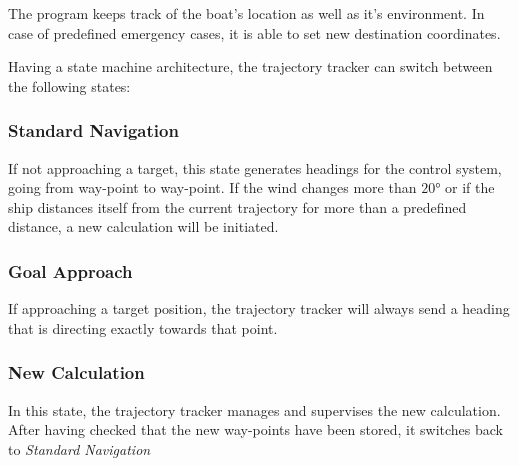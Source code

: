 The program keeps track of the boat's location as well as it's environment. In
case of predefined emergency cases, it is able to set new destination coordinates.

Having a state machine architecture, the trajectory tracker can switch between
the following states:
%
\subsubsection{Standard Navigation}
If not approaching a target, this state generates headings for the
control system, going from way-point to way-point. If the wind changes more than $20$°
or if the ship distances itself from the current trajectory for more than a
predefined distance, a new calculation will be initiated. 
\subsubsection{Goal Approach}
If approaching a target position, the trajectory tracker will always send a
heading that is directing exactly towards that point.
\subsubsection{New Calculation}
In this state, the trajectory tracker manages and supervises the new
calculation. After having checked that the new way-points have been stored, it
switches back to \textit{Standard Navigation}
%
%
